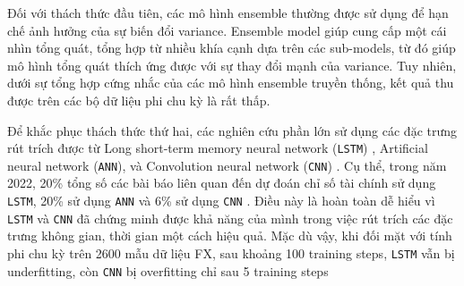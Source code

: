 \documentclass[aps,prb,groupedaddress,twocolumn,showpacs,dvipdfmx,superscriptaddress,pdftex]{revtex4-2}
\begin{document}

\vspace{2mm}

Đối với thách thức đầu tiên, các mô hình ensemble \citep{sadeghi2021combined, zafeiriou2020intraday, ali2020complete} thường được sử dụng để hạn chế ảnh hưởng của sự biến đổi variance. Ensemble model giúp cung cấp một cái nhìn tổng quát, tổng hợp từ nhiều khía cạnh dựa trên các sub-models, từ đó giúp mô hình tổng quát thích ứng được với sự thay đổi mạnh của variance. Tuy nhiên, dưới sự tổng hợp cứng nhắc của các mô hình ensemble truyền thống, kết quả thu được trên các bộ dữ liệu phi chu kỳ là rất thấp.


\vspace{2mm}

Để khắc phục thách thức thứ hai, các nghiên cứu phần lớn sử dụng các đặc trưng rút trích được từ Long short-term memory neural network (\verb|LSTM|) \cite{hochreiter1997long}, Artificial neural network (\verb|ANN|), và Convolution neural network (\verb|CNN|) \cite{lecun1989handwritten}. Cụ thể, trong năm 2022, 20\% tổng số các bài báo liên quan đến dự đoán chỉ số tài chính sử dụng \verb|LSTM|, 20\% sử dụng \verb|ANN| và 6\% sử dụng \verb|CNN| \cite{ayitey2023forex}. Điều này là hoàn toàn dễ hiểu vì \verb|LSTM| và \verb|CNN| đã chứng minh được khả năng của mình trong việc rút trích các đặc trưng không gian, thời gian một cách hiệu quả. Mặc dù vậy, khi đối mặt với tính phi chu kỳ trên 2600 mẫu dữ liệu FX, sau khoảng 100 training steps, \verb|LSTM| vẫn bị underfitting, còn \verb|CNN| bị overfitting chỉ sau 5 training steps
\end{document}
